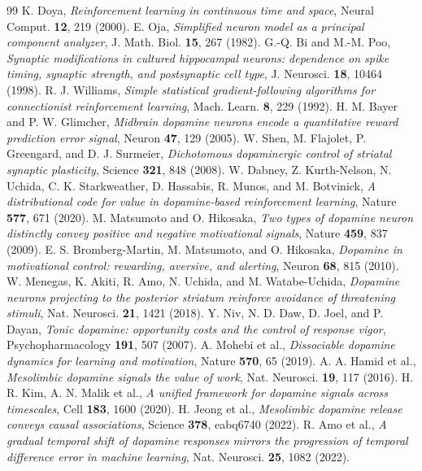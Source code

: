 \begin{thebibliography}{99}
 K. Doya, \emph{Reinforcement learning in continuous time and space}, Neural Comput. \textbf{12}, 219 (2000).
 E. Oja, \emph{Simplified neuron model as a principal component analyzer}, J. Math. Biol. \textbf{15}, 267 (1982).
 G.-Q. Bi and M.-M. Poo, \emph{Synaptic modifications in cultured hippocampal neurons: dependence on spike timing, synaptic strength, and postsynaptic cell type}, J. Neurosci. \textbf{18}, 10464 (1998).
 R. J. Williams, \emph{Simple statistical gradient-following algorithms for connectionist reinforcement learning}, Mach. Learn. \textbf{8}, 229 (1992).
 H. M. Bayer and P. W. Glimcher, \emph{Midbrain dopamine neurons encode a quantitative reward prediction error signal}, Neuron \textbf{47}, 129 (2005).
 W. Shen, M. Flajolet, P. Greengard, and D. J. Surmeier, \emph{Dichotomous dopaminergic control of striatal synaptic plasticity}, Science \textbf{321}, 848 (2008).
 W. Dabney, Z. Kurth-Nelson, N. Uchida, C. K. Starkweather, D. Hassabis, R. Munos, and M. Botvinick, \emph{A distributional code for value in dopamine-based reinforcement learning}, Nature \textbf{577}, 671 (2020).
 M. Matsumoto and O. Hikosaka, \emph{Two types of dopamine neuron distinctly convey positive and negative motivational signals}, Nature \textbf{459}, 837 (2009).
 E. S. Bromberg-Martin, M. Matsumoto, and O. Hikosaka, \emph{Dopamine in motivational control: rewarding, aversive, and alerting}, Neuron \textbf{68}, 815 (2010).
 W. Menegas, K. Akiti, R. Amo, N. Uchida, and M. Watabe-Uchida, \emph{Dopamine neurons projecting to the posterior striatum reinforce avoidance of threatening stimuli}, Nat. Neurosci. \textbf{21}, 1421 (2018).
 Y. Niv, N. D. Daw, D. Joel, and P. Dayan, \emph{Tonic dopamine: opportunity costs and the control of response vigor}, Psychopharmacology \textbf{191}, 507 (2007).
 A. Mohebi et al., \emph{Dissociable dopamine dynamics for learning and motivation}, Nature \textbf{570}, 65 (2019).
 A. A. Hamid et al., \emph{Mesolimbic dopamine signals the value of work}, Nat. Neurosci. \textbf{19}, 117 (2016).
 H. R. Kim, A. N. Malik et al., \emph{A unified framework for dopamine signals across timescales}, Cell \textbf{183}, 1600 (2020).
 H. Jeong et al., \emph{Mesolimbic dopamine release conveys causal associations}, Science \textbf{378}, eabq6740 (2022).
 R. Amo et al., \emph{A gradual temporal shift of dopamine responses mirrors the progression of temporal difference error in machine learning}, Nat. Neurosci. \textbf{25}, 1082 (2022).

\end{thebibliography}
